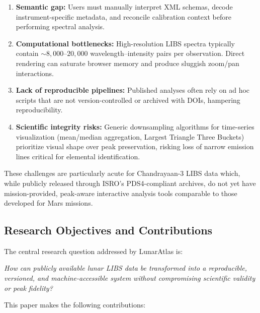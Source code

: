 \documentclass[12pt,a4paper]{article}
\begin{document}
\begin{enumerate}[label=(\roman*),nosep]
  \item \textbf{Semantic gap:} Users must manually interpret XML schemas, decode instrument-specific metadata, and reconcile calibration context before performing spectral analysis.
  \item \textbf{Computational bottlenecks:} High-resolution LIBS spectra typically contain \(\sim 8{,}000\)--\(20{,}000\) wavelength--intensity pairs per observation. Direct rendering can saturate browser memory and produce sluggish zoom/pan interactions.
  \item \textbf{Lack of reproducible pipelines:} Published analyses often rely on ad hoc scripts that are not version-controlled or archived with DOIs, hampering reproducibility.
  \item \textbf{Scientific integrity risks:} Generic downsampling algorithms for time-series visualization (mean/median aggregation, Largest Triangle Three Buckets) prioritize visual shape over peak preservation, risking loss of narrow emission lines critical for elemental identification.
\end{enumerate}

These challenges are particularly acute for Chandrayaan-3 LIBS data which, while publicly released through ISRO's PDS4-compliant archives, do not yet have mission-provided, peak-aware interactive analysis tools comparable to those developed for Mars missions.

\subsection{Research Objectives and Contributions}

The central research question addressed by LunarAtlas is:

\medskip
\noindent\emph{How can publicly available lunar LIBS data be transformed into a reproducible, versioned, and machine-accessible system without compromising scientific validity or peak fidelity?}
\medskip

This paper makes the following contributions:
\end{document}
